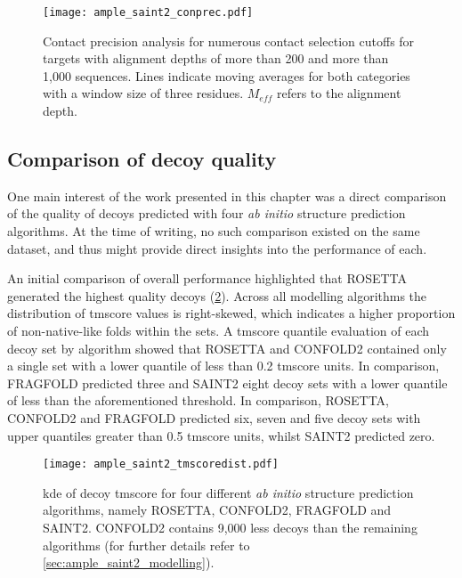 \begin{figure}[H]
    \centering
    \texttt{[image: ample\_saint2\_conprec.pdf]}
    \caption[Contact predicion analysis for numerous contact selection cutoffs]{Contact precision analysis for numerous contact selection cutoffs for targets with alignment depths of more than 200 and more than 1,000 sequences. Lines indicate moving averages for both categories with a window size of three residues. $M_{eff}$ refers to the alignment depth.}
    \label{fig:ample_saint2_conprec}
\end{figure}

\subsection{Comparison of decoy quality}
One main interest of the work presented in this chapter was a direct comparison of the quality of decoys predicted with four \textit{ab initio} structure prediction algorithms. At the time of writing, no such comparison existed on the same dataset, and thus might provide direct insights into the performance of each.

An initial comparison of overall performance highlighted that ROSETTA generated the highest quality decoys (\cref{fig:ample_saint2_tmscoredist}). Across all modelling algorithms the distribution of \gls{tmscore} values is right-skewed, which indicates a higher proportion of non-native-like folds within the sets. A \gls{tmscore} quantile evaluation of each decoy set by algorithm showed that ROSETTA and CONFOLD2 contained only a single set with a lower quantile of less than 0.2 \gls{tmscore} units. In comparison, FRAGFOLD predicted three and SAINT2 eight decoy sets with a lower quantile of less than the aforementioned threshold. In comparison, ROSETTA, CONFOLD2 and FRAGFOLD predicted six, seven and five decoy sets with upper quantiles greater than 0.5 \gls{tmscore} units, whilst SAINT2 predicted zero.

\begin{figure}[H]
    \centering
    \texttt{[image: ample\_saint2\_tmscoredist.pdf]}
    \caption[Distribution of decoy TM-scores for four modelling algorithms]{\gls{kde} of decoy \gls{tmscore} for four different \textit{ab initio} structure prediction algorithms, namely ROSETTA, CONFOLD2, FRAGFOLD and SAINT2. CONFOLD2 contains 9,000 less decoys than the remaining algorithms (for further details refer to \cref{sec:ample_saint2_modelling}).}
    \label{fig:ample_saint2_tmscoredist}
\end{figure}

